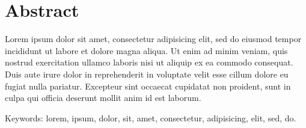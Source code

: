 
\thispagestyle{plain}			%
\setlength{\parskip}{0pt plus 1.0pt}
\section*{Abstract}


Lorem ipsum dolor sit amet, consectetur adipisicing elit, sed do eiusmod tempor incididunt ut labore et dolore magna aliqua. Ut enim ad minim veniam, quis nostrud exercitation ullamco laboris nisi ut aliquip ex ea commodo consequat. Duis aute irure dolor in reprehenderit in voluptate velit esse cillum dolore eu fugiat nulla pariatur. Excepteur sint occaecat cupidatat non proident, sunt in culpa qui officia deserunt mollit anim id est laborum.

\vfill
Keywords: lorem, ipsum, dolor, sit, amet, consectetur, adipisicing, elit, sed, do.

\newpage				%
\thispagestyle{empty}
\mbox{}